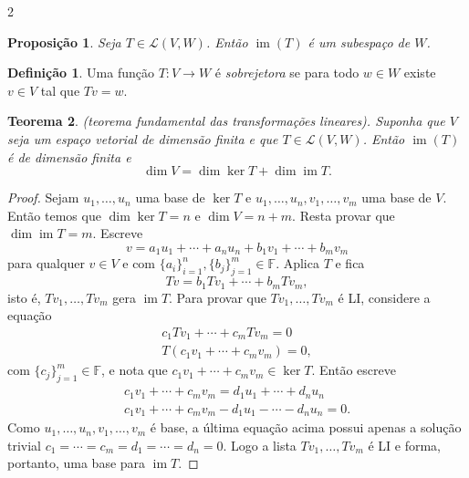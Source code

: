 \documentclass{article}
\theoremstyle{plain}
\newtheorem{thm}{Teorema}[section]
\newtheorem{prop}[thm]{Proposição}
\theoremstyle{definition}
\newtheorem{defn}{Definição}[section]
\theoremstyle{remark}
\DeclareMathOperator{\im}{im}
\begin{document}
\begin{multicols}{2}
\begin{prop}
    Seja \(T \in \mathcal{L}(V, W)\). Então \(\im(T)\) é um subespaço de \(W\).
\end{prop}

\begin{defn}
    Uma função \(T: V \to W\) é \emph{sobrejetora} se para todo \(w \in W\) existe \(v \in V\) tal que \(Tv = w\).
\end{defn}

\begin{thm} (teorema fundamental das transformações lineares).
    Suponha que \(V\) seja um espaço vetorial de dimensão finita e que \(T \in \mathcal{L}(V, W)\). Então \(\im(T)\) é de dimensão finita e
    \begin{equation}
        \dim V = \dim \ker T + \dim \im T.
    \end{equation}
\end{thm}

\begin{proof}
    Sejam \(u_1, \ldots, u_n\) uma base de \(\ker T\) e \(u_1, \ldots, u_n, v_1, \ldots, v_m\) uma base de \(V\). Então temos que \(\dim \ker T = n\) e \(\dim V = n+m\). Resta provar que \(\dim \im T = m\).
    Escreve
    \[
        v = a_1 u_1 + \cdots + a_n u_n + b_1 v_1 + \cdots + b_m v_m
    \]
    \noindent para qualquer \(v \in V\) e com \(\{a_i\}_{i=1}^n, \{b_j\}_{j=1}^m \in \mathbb{F}\). Aplica \(T\) e fica 
    \[
        Tv = b_1 Tv_1 + \cdots + b_m Tv_m ,
    \]
    \noindent isto é, \(Tv_1, \ldots, Tv_m\) gera \(\im T\). Para provar que \(Tv_1, \ldots, Tv_m\) é LI, considere a equação
    \begin{gather}
        c_1 Tv_1 + \cdots + c_m Tv_m = 0 \\
        T(c_1 v_1 + \cdots + c_m v_m) = 0,
    \end{gather}
    \noindent com \(\{c_j\}_{j=1}^m \in \mathbb{F}\), e nota que \(c_1 v_1 + \cdots + c_m v_m \in \ker T\). Então escreve 
    \begin{gather}
        c_1 v_1 + \cdots + c_m v_m = d_1 u_1 + \cdots + d_n u_n \\
        c_1 v_1 + \cdots + c_m v_m - d_1 u_1 - \cdots - d_n u_n = 0.
    \end{gather}
    Como \(u_1, \ldots, u_n, v_1, \ldots, v_m\) é base, a última equação acima possui apenas a solução trivial \(c_1 = \cdots = c_m = d_1 = \cdots = d_n = 0\). Logo a lista \(Tv_1, \ldots, Tv_m\) é LI e forma, portanto, uma base para \(\im T\).
\end{proof}


\end{multicols}
\end{document}
